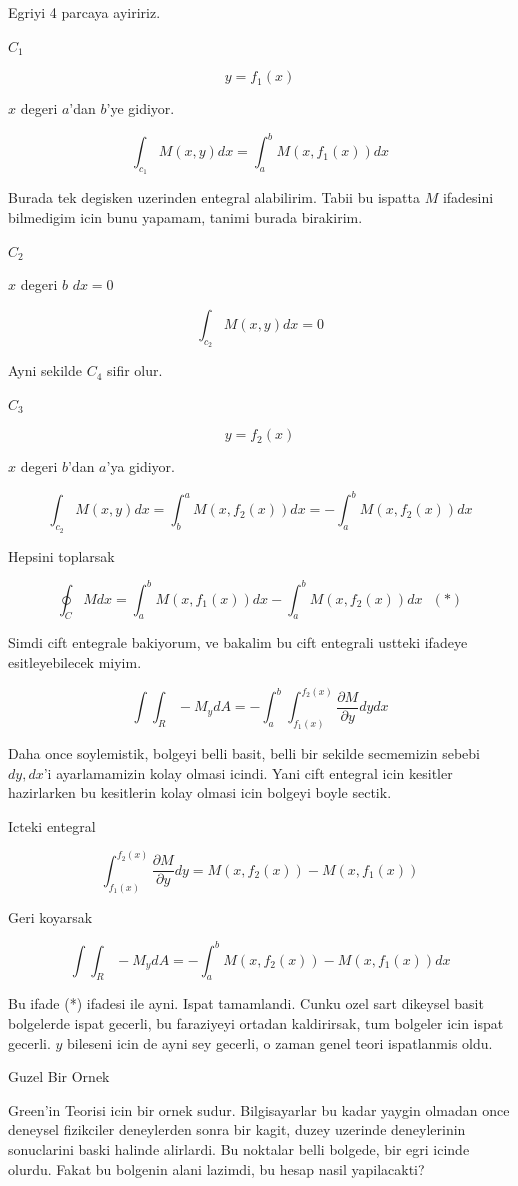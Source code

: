 \documentclass[12pt,fleqn]{article}
\begin{document}
Egriyi 4 parcaya ayiririz. 

$C_1$

\[ y = f_1(x) \]

$x$ degeri $a$'dan $b$'ye gidiyor. 

\[ \int_{c_1}M(x,y) dx = \int_a^b M(x,f_1(x))  dx\]

Burada tek degisken uzerinden entegral alabilirim. Tabii bu ispatta $M$
ifadesini bilmedigim icin bunu yapamam, tanimi burada birakirim. 

$C_2$

$x$ degeri $b$ $dx = 0$

\[ \int_{c_2}M(x,y) dx = 0\]

Ayni sekilde $C_4$ sifir olur. 

$C_3$

\[ y = f_2(x) \]

$x$ degeri $b$'dan $a$'ya gidiyor. 

\[ \int_{c_2}M(x,y) dx = \int_b^a M(x,f_2(x)) dx = 
-  \int_a^b M(x,f_2(x)) dx 
\]

Hepsini toplarsak

\[ \oint_C M dx  =
\int_a^b M(x,f_1(x))  dx -
\int_a^b M(x,f_2(x)) dx  \  \  \ (*)
 \]

Simdi cift entegrale bakiyorum, ve bakalim bu cift entegrali ustteki
ifadeye esitleyebilecek miyim. 

\[ \int \int_R -M_y dA = 
- \int_a^b \int_{f_1(x)}^{f_2(x)} \frac{\partial M}{\partial y} dy dx \]

Daha once soylemistik, bolgeyi belli basit, belli bir sekilde secmemizin
sebebi $dy,dx$'i ayarlamamizin kolay olmasi icindi. Yani cift entegral icin
kesitler hazirlarken bu kesitlerin kolay olmasi icin bolgeyi boyle
sectik. 

Icteki entegral

\[ \int_{f_1(x)}^{f_2(x)} \frac{\partial M}{\partial y} dy =
M(x,f_2(x)) - M(x,f_1(x))
 \]

Geri koyarsak

\[ \int \int_R -M_y dA = 
- \int_a^b M(x,f_2(x)) - M(x,f_1(x)) dx \]

Bu ifade (*) ifadesi ile ayni. Ispat tamamlandi. Cunku ozel sart dikeysel
basit bolgelerde ispat gecerli, bu faraziyeyi ortadan kaldirirsak, tum
bolgeler icin ispat gecerli. $y$ bileseni icin de ayni sey gecerli, o zaman
genel teori ispatlanmis oldu. 

Guzel Bir Ornek 

Green'in Teorisi icin bir ornek sudur. Bilgisayarlar bu kadar yaygin olmadan
once deneysel fizikciler deneylerden sonra bir kagit, duzey uzerinde
deneylerinin sonuclarini baski halinde alirlardi. Bu noktalar belli
bolgede, bir egri icinde olurdu. Fakat bu bolgenin alani lazimdi, bu hesap
nasil yapilacakti?
\end{document}
